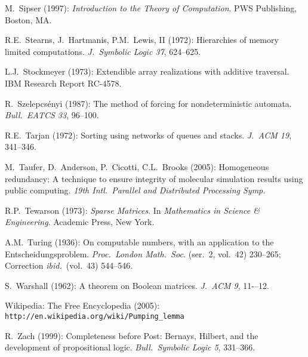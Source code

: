 \begin{thebibliography}{999}
M.~Sipser (1997):
{\it Introduction to the Theory of Computation}.
PWS Publishing, Boston, MA.

R.E.~Stearns, J.~Hartmanis, P.M.~Lewis, II (1972): Hierarchies of
memory limited computations.  {\it J.~Symbolic Logic 37}, 624--625.

L.J.~Stockmeyer (1973): Extendible array realizations with additive
traversal.  IBM Research Report RC-4578.

R.~Szelepcs\'{e}nyi (1987): The method of forcing for nondeterministic
automata.  {\em Bull.~EATCS 33}, 96--100.


R.E.~Tarjan (1972): Sorting using networks of queues and stacks.  {\it
  J.~ACM 19}, 341--346.

M.~Taufer, D.~Anderson, P.~Cicotti, C.L.~Brooks (2005): Homogeneous
redundancy: A technique to ensure integrity of molecular simulation
results using public computing.  {\it 19th Intl.~Parallel and
Distributed Processing Symp.}

R.P.~Tewarson (1973):
{\it Sparse Matrices}.  In {\it Mathematics in Science \&
  Engineering}.
Academic Press, New York.

A.M.~Turing (1936): On computable numbers, with an application to the
Entscheidungsproblem.  {\it Proc.~London Math.~Soc.} (ser.~2, vol.~42)
230--265; Correction {\it ibid.}~(vol.~43) 544--546.


S.~Warshall (1962): A theorem on Boolean matrices.  {\it J.~ACM 9},
11-–12.


Wikipedia: The Free Encyclopedia (2005): \\
{\tt http://en.wikipedia.org/wiki/Pumping\_lemma}


R.~Zach (1999): Completeness before Post: Bernays, Hilbert, and the
development of propositional logic.  {\it Bull.~Symbolic Logic 5},
331--366.

\end{thebibliography}

